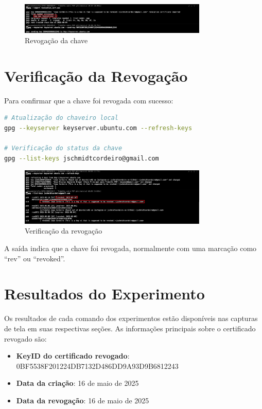 \begin{figure}[htb]
    \centering
    \includegraphics[width=0.8\textwidth]{images/02-revogacao_chave.jpeg}
    \caption{Revogação da chave}
    \label{fig:revogacao-chave}
\end{figure}

\section{Verificação da Revogação}
Para confirmar que a chave foi revogada com sucesso:

\begin{lstlisting}[language=bash]
# Atualização do chaveiro local
gpg --keyserver keyserver.ubuntu.com --refresh-keys

# Verificação do status da chave
gpg --list-keys jschmidtcordeiro@gmail.com
\end{lstlisting}

\begin{figure}[htb]
    \centering
    \includegraphics[width=0.8\textwidth]{images/02-verificacao_revogacao_chave.jpeg}
    \caption{Verificação da revogação}
    \label{fig:verificacao-revogacao}
\end{figure}

A saída indica que a chave foi revogada, normalmente com uma marcação como ``rev'' ou ``revoked''.

\section{Resultados do Experimento}

Os resultados de cada comando dos experimentos estão disponíveis nas capturas de tela em suas respectivas seções. As informações principais sobre o certificado revogado são:

\begin{itemize}
    \item \textbf{KeyID do certificado revogado}: 0BF5538F201224DB7132D486DD9A93D9B6812243
    \item \textbf{Data da criação}: 16 de maio de 2025
    \item \textbf{Data da revogação}: 16 de maio de 2025
\end{itemize}